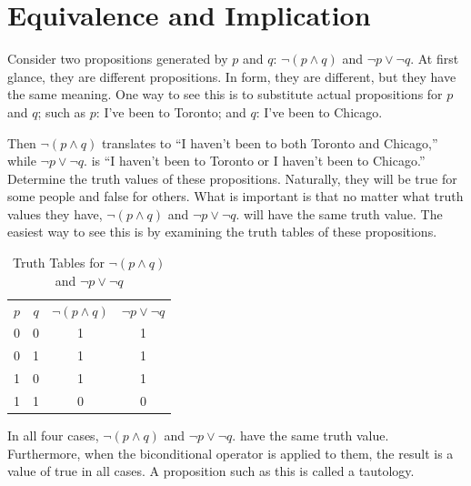 \documentclass[10pt,]{book}
\theoremstyle{plain}
\theoremstyle{definition}
\theoremstyle{definition}
\theoremstyle{definition}
\theoremstyle{definition}
\begin{document}
\section[Equivalence and Implication]{Equivalence and Implication}\label{c3s3}
\typeout{************************************************}
\typeout{************************************************}
Consider two propositions generated by \(p\) and \(q\): \(\neg (p \land  q)\) and \(\neg p \lor  \neg q\). At first glance, they are different propositions. In form, they are different, but they have the same meaning. One way to see this is to substitute actual propositions for \(p\) and \(q\); such as
\(p\): I've been to Toronto; and \(q\): I've been to Chicago.%
\par
Then \(\neg (p \land  q)\) translates to ``I haven't been to both Toronto and Chicago,'' while \(\neg p \lor  \neg q.\) is ``I haven't been to Toronto or I haven't been to Chicago.'' Determine the truth values of these propositions. Naturally, they will be true for some people and false for others. What is important is that no matter what truth values they have, \(\neg (p \land  q)\) and \(\neg p \lor  \neg q.\) will have the same truth value. The easiest way to see this is by examining the truth tables of these propositions.%
\leavevmode%
\begin{table}
\centering
\begin{tabular}{cccc}
\(p\)&\(q\)&\(\neg (p\land q)\)&\(\neg p\lor \neg q \)\tabularnewline[0pt]
0&0&1&1 \tabularnewline[0pt]
0&1&1&1 \tabularnewline[0pt]
1&0&1&1 \tabularnewline[0pt]
1&1&0&0 
\end{tabular}
\caption{Truth Tables for \(\neg (p \land  q)\) and \(\neg p \lor  \neg q\)\label{tt33-1}}
\end{table}
\par
In all four cases, \(\neg (p \land  q)\) and \(\neg p \lor  \neg q.\) have the same truth value. Furthermore, when the biconditional operator is applied to them, the result is a value of true in all cases.  A proposition such as this is called a tautology.%
\typeout{************************************************}
\typeout{************************************************}
\end{document}
